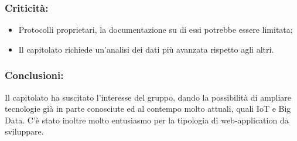 	\subsubsection{Criticità:}
		\begin{itemize}
			\item Protocolli proprietari, la documentazione su di essi potrebbe essere limitata;
			\item Il capitolato richiede un'analisi dei dati più avanzata rispetto agli altri.
		\end{itemize}
		
	\subsubsection{Conclusioni:}
		Il capitolato ha suscitato l'interesse del gruppo, dando la possibilità di ampliare tecnologie già in parte conosciute ed al contempo molto attuali, quali IoT e Big Data. C'è stato inoltre molto entusiasmo per la tipologia di web-application da sviluppare.

